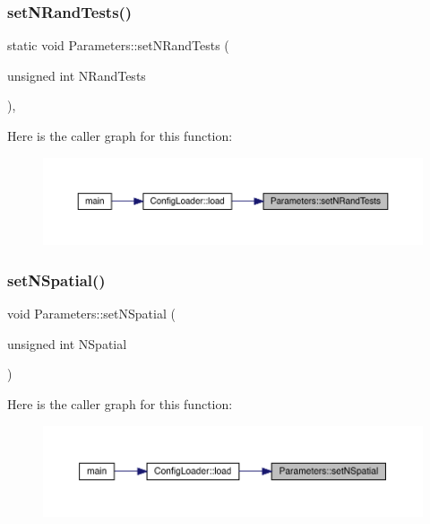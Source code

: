 \subsubsection{\texorpdfstring{setNRandTests()}{setNRandTests()}}
{\footnotesize\ttfamily static void Parameters\+::set\+N\+Rand\+Tests (\begin{DoxyParamCaption}\item[{unsigned int}]{N\+Rand\+Tests }\end{DoxyParamCaption})\hspace{0.3cm}{\ttfamily [inline]}, {\ttfamily [static]}}

Here is the caller graph for this function\+:
\nopagebreak
\begin{figure}[H]
\begin{center}
\leavevmode
\includegraphics[width=350pt]{class_parameters_a24bd9c86cda80898bc65b950983b6a17_icgraph}
\end{center}
\end{figure}
\mbox{\label{class_parameters_a4b2041032efc8d6e9f99a99f87543f26}} 
\subsubsection{\texorpdfstring{setNSpatial()}{setNSpatial()}}
{\footnotesize\ttfamily void Parameters\+::set\+N\+Spatial (\begin{DoxyParamCaption}\item[{unsigned int}]{N\+Spatial }\end{DoxyParamCaption})\hspace{0.3cm}{\ttfamily [static]}}

Here is the caller graph for this function\+:
\nopagebreak
\begin{figure}[H]
\begin{center}
\leavevmode
\includegraphics[width=350pt]{class_parameters_a4b2041032efc8d6e9f99a99f87543f26_icgraph}
\end{center}
\end{figure}
\mbox{\label{class_parameters_a8b9ea6055d41cd08a060bc72332a63af}} 
